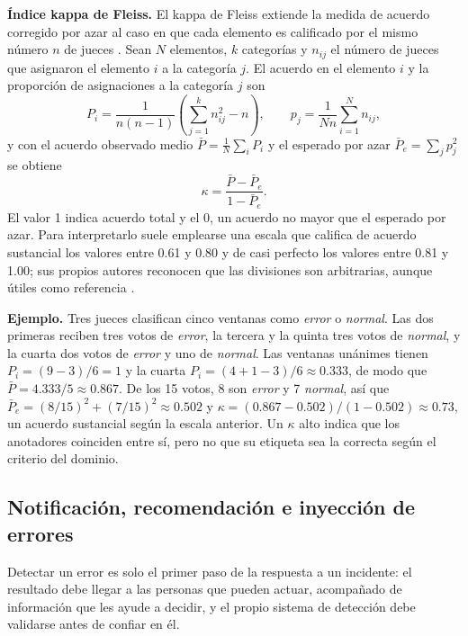 \textbf{Índice kappa de Fleiss.} El kappa de Fleiss extiende la medida de acuerdo corregido por azar al caso en que cada elemento es calificado por el mismo número $n$ de jueces \cite{fleiss1971_kappa}. Sean $N$ elementos, $k$ categorías y $n_{ij}$ el número de jueces que asignaron el elemento $i$ a la categoría $j$. El acuerdo en el elemento $i$ y la proporción de asignaciones a la categoría $j$ son
\begin{equation}
P_i = \frac{1}{n(n-1)} \left( \sum_{j=1}^{k} n_{ij}^2 - n \right), \qquad p_j = \frac{1}{N n} \sum_{i=1}^{N} n_{ij},
\end{equation}
y con el acuerdo observado medio $\bar{P} = \frac{1}{N}\sum_i P_i$ y el esperado por azar $\bar{P}_e = \sum_j p_j^2$ se obtiene
\begin{equation}
\kappa = \frac{\bar{P} - \bar{P}_e}{1 - \bar{P}_e}.
\end{equation}
El valor 1 indica acuerdo total y el 0, un acuerdo no mayor que el esperado por azar. Para interpretarlo suele emplearse una escala que califica de acuerdo sustancial los valores entre 0.61 y 0.80 y de casi perfecto los valores entre 0.81 y 1.00; sus propios autores reconocen que las divisiones son arbitrarias, aunque útiles como referencia \cite{landis1977_kappa}.

\textbf{Ejemplo.} Tres jueces clasifican cinco ventanas como \emph{error} o \emph{normal}. Las dos primeras reciben tres votos de \emph{error}, la tercera y la quinta tres votos de \emph{normal}, y la cuarta dos votos de \emph{error} y uno de \emph{normal}. Las ventanas unánimes tienen $P_i = (9 - 3)/6 = 1$ y la cuarta $P_i = (4 + 1 - 3)/6 \approx 0.333$, de modo que $\bar{P} = 4.333/5 \approx 0.867$. De los 15 votos, 8 son \emph{error} y 7 \emph{normal}, así que $\bar{P}_e = (8/15)^2 + (7/15)^2 \approx 0.502$ y $\kappa = (0.867 - 0.502)/(1 - 0.502) \approx 0.73$, un acuerdo sustancial según la escala anterior. Un $\kappa$ alto indica que los anotadores coinciden entre sí, pero no que su etiqueta sea la correcta según el criterio del dominio.

\subsection{Notificación, recomendación e inyección de errores}\label{sec:mt_reaccion}

Detectar un error es solo el primer paso de la respuesta a un incidente: el resultado debe llegar a las personas que pueden actuar, acompañado de información que les ayude a decidir, y el propio sistema de detección debe validarse antes de confiar en él.

